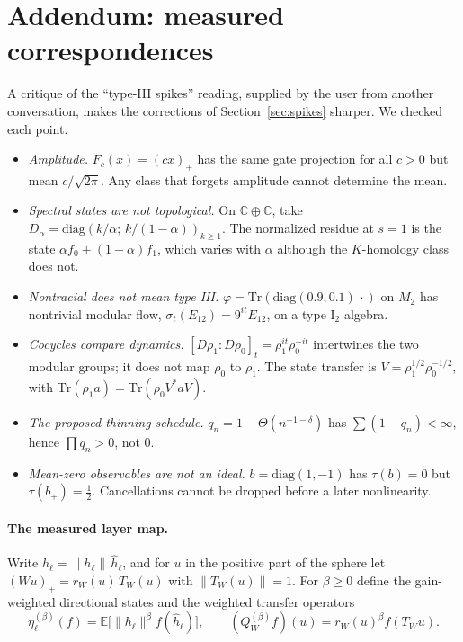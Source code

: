 \documentclass[11pt]{article}
\theoremstyle{definition}
\theoremstyle{remark}
\newcommand{\E}{\mathbb E}
\begin{document}
\section{Addendum: measured correspondences}\label{sec:measured}

A critique of the ``type-III spikes'' reading, supplied by the user from another conversation, makes the corrections of Section~\ref{sec:spikes} sharper. We checked each point.
\begin{itemize}
\item \emph{Amplitude.} $F_c(x)=(cx)_+$ has the same gate projection for all $c>0$ but mean $c/\sqrt{2\pi}$. Any class that forgets amplitude cannot determine the mean.
\item \emph{Spectral states are not topological.} On $\mathbb C\oplus\mathbb C$, take $D_\alpha=\mathrm{diag}(k/\alpha;\,k/(1-\alpha))_{k\ge1}$. The normalized residue at $s=1$ is the state $\alpha f_0+(1-\alpha)f_1$, which varies with $\alpha$ although the $K$-homology class does not.
\item \emph{Nontracial does not mean type III.} $\varphi=\mathrm{Tr}(\mathrm{diag}(0.9,0.1)\,\cdot)$ on $M_2$ has nontrivial modular flow, $\sigma_t(E_{12})=9^{it}E_{12}$, on a type I$_2$ algebra.
\item \emph{Cocycles compare dynamics.} $[D\rho_1:D\rho_0]_t=\rho_1^{it}\rho_0^{-it}$ intertwines the two modular groups; it does not map $\rho_0$ to $\rho_1$. The state transfer is $V=\rho_1^{1/2}\rho_0^{-1/2}$, with $\mathrm{Tr}(\rho_1a)=\mathrm{Tr}(\rho_0V^*aV)$.
\item \emph{The proposed thinning schedule.} $q_n=1-\Theta(n^{-1-\delta})$ has $\sum(1-q_n)<\infty$, hence $\prod q_n>0$, not $0$.
\item \emph{Mean-zero observables are not an ideal.} $b=\mathrm{diag}(1,-1)$ has $\tau(b)=0$ but $\tau(b_+)=\tfrac12$. Cancellations cannot be dropped before a later nonlinearity.
\end{itemize}

\paragraph{The measured layer map.} Write $h_{\ell}=\|h_\ell\|\,\hat h_\ell$, and for $u$ in the positive part of the sphere let $(Wu)_+=r_W(u)\,T_W(u)$ with $\|T_W(u)\|=1$. For $\beta\ge0$ define the gain-weighted directional states and the weighted transfer operators
\[
\eta^{(\beta)}_\ell(f)=\E\big[\|h_\ell\|^\beta f(\hat h_\ell)\big],\qquad (Q^{(\beta)}_Wf)(u)=r_W(u)^\beta f(T_Wu).
\]
\end{document}
